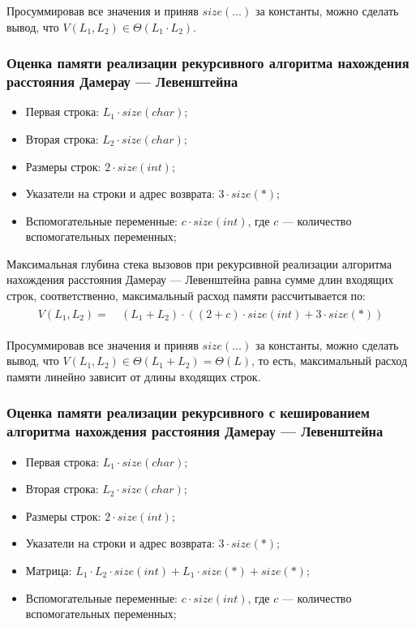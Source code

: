 Просуммировав все значения и приняв $size(\dots)$ за константы, можно сделать вывод, что $V(L_1,L_2) \in \Theta(L_1 \cdot L_2)$.

\subsubsection{Оценка памяти реализации рекурсивного алгоритма нахождения расстояния Дамерау --- Левенштейна}
\begin{itemize}
    \item Первая строка: $L_1 \cdot size(char)$;
    \item Вторая строка: $L_2 \cdot size(char)$;
    \item Размеры строк: $2 \cdot size(int)$;
    \item Указатели на строки и адрес возврата: $3 \cdot size(*)$;
    \item Вспомогательные переменные: $c \cdot size(int)$, где $c$ --- количество вспомогательных переменных;
\end{itemize}

Максимальная глубина стека вызовов при рекурсивной реализации алгоритма нахождения расстояния Дамерау --- Левенштейна равна сумме длин входящих строк, соответственно, максимальный расход памяти рассчитывается по:
\begin{multline}
\begin{aligned}
V(L_1,L_2) =\ &(L_1 + L_2) \cdot ((2 + c) \cdot size(int) + 3 \cdot size(*))
\end{aligned}
\end{multline}

Просуммировав все значения и приняв $size(\dots)$ за константы, можно сделать вывод, что $V(L_1,L_2) \in \Theta(L_1 + L_2) = \Theta(L)$, то есть, максимальный расход памяти линейно зависит от длины входящих строк.

\subsubsection{Оценка памяти реализации рекурсивного с кешированием алгоритма нахождения расстояния Дамерау --- Левенштейна}

\begin{itemize}
    \item Первая строка: $L_1 \cdot size(char)$;
    \item Вторая строка: $L_2 \cdot size(char)$;
    \item Размеры строк: $2 \cdot size(int)$;
    \item Указатели на строки и адрес возврата: $3 \cdot size(*)$;
    \item Матрица: $L_1 \cdot L_2 \cdot size(int) + L_1 \cdot size(*) + size(*)$;
    \item Вспомогательные переменные: $c \cdot size(int)$, где $c$ --- количество вспомогательных переменных;
\end{itemize}

